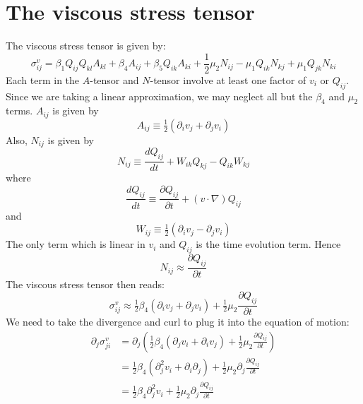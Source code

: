 \documentclass[reqno]{article}
\begin{document}
\section{The viscous stress tensor}
The viscous stress tensor is given by:
\begin{equation}
	\sigma^v_{ij} = \beta_1 Q_{ij}Q_{kl}A_{kl} 
	+ \beta_4 A_{ij} + \beta_5 Q_{ik} A_{ki} 
	+ \frac{1}{2} \mu_2 N_{ij} 
	- \mu_1 Q_{ik}N_{kj} 
	+ \mu_1 Q_{jk}N_{ki}
\end{equation}
Each term in the $A$-tensor and $N$-tensor involve at least one factor of $v_i$ or $Q_{ij}$.
Since we are taking a linear approximation, we may neglect all but the $\beta_4$ and $\mu_2$ terms.
$A_{ij}$ is given by
\begin{equation}
	A_{ij} \equiv \tfrac12 \left(
	\partial_i v_j + \partial_j v_i
	\right)
\end{equation}
Also, $N_{ij}$ is given by
\begin{equation}
	N_{ij} 
	\equiv \frac{d Q_{ij}}{dt}
	+ W_{ik} Q_{kj}
	- Q_{ik} W_{kj}
\end{equation}
where
\begin{equation}
	\frac{d Q_{ij}}{dt}
	\equiv \frac{\partial Q_{ij}}{\partial t}
	+ \left( v \cdot \nabla \right) Q_{ij}
\end{equation}
and
\begin{equation}
	W_{ij}
	\equiv \tfrac12 \left(
	\partial_i v_j - \partial_j v_i 
	\right)
\end{equation}
The only term which is linear in $v_i$ and $Q_{ij}$ is the time evolution term. Hence
\begin{equation}
	N_{ij} \approx \frac{\partial Q_{ij}}{\partial t}
\end{equation}
The viscous stress tensor then reads:
\begin{equation}
	\sigma^v_{ij}
	\approx \tfrac12 \beta_4 \left(
	\partial_i v_j + \partial_j v_i
	\right)
	+ \tfrac12 \mu_2 \frac{\partial Q_{ij}}{\partial t}
\end{equation}
We need to take the divergence and curl to plug it into the equation of motion:
\begin{equation}
\begin{split}
	\partial_j \sigma^v_{ji}
	&= \partial_j \left(
	\tfrac12 \beta_4 
	\left(
	\partial_j v_i + \partial_i v_j
	\right)
	+ \tfrac12 \mu_2 \frac{\partial Q_{ij}}{\partial t}
	\right) \\
	&= \tfrac12 \beta_4
	\left(
	\partial_j^2 v_i + \partial_i \partial_j
	\right)
	+ \tfrac12 \mu_2 \partial_j \frac{\partial Q_{ij}}{\partial t} \\
	&= \tfrac12 \beta_4 \partial_j^2 v_i 
	+ \tfrac12 \mu_2 \partial_j \frac{\partial Q_{ij}}{\partial t}
\end{split}
\end{equation}
\end{document}
